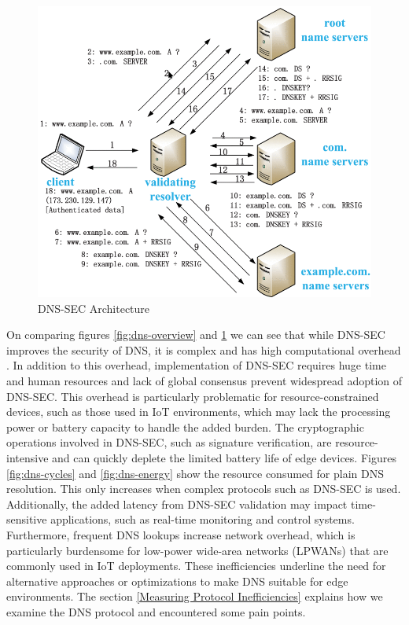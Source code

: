 \documentclass[conference]{IEEEtran}
\begin{document}
\begin{figure}[htbp]
    \centering
    \includegraphics[width=1\linewidth]{images/dnssec-overview.png}
    \caption{DNS-SEC Architecture \cite{8653281}}
    \label{fig:DNS-SEC-overview}
\end{figure}

On comparing figures \ref{fig:dns-overview} and \ref{fig:DNS-SEC-overview} we can see that while DNS-SEC improves the security of DNS, it is complex and has high computational overhead \cite{8653281}. In addition to this overhead, implementation of DNS-SEC requires huge time and human resources and lack of global consensus \cite{polo-2022} prevent widespread adoption of DNS-SEC. This overhead is particularly problematic for resource-constrained devices, such as those used in IoT environments, which may lack the processing power or battery capacity to handle the added burden. The cryptographic operations involved in DNS-SEC, such as signature verification, are resource-intensive and can quickly deplete the limited battery life of edge devices. Figures \ref{fig:dns-cycles} and \ref{fig:dns-energy} show the resource consumed for plain DNS resolution. This only increases when complex protocols such as DNS-SEC is used. Additionally, the added latency from DNS-SEC validation may impact time-sensitive applications, such as real-time monitoring and control systems. Furthermore, frequent DNS lookups increase network overhead, which is particularly burdensome for low-power wide-area networks (LPWANs) that are commonly used in IoT deployments. These inefficiencies underline the need for alternative approaches or optimizations to make DNS suitable for edge environments. The section \ref{Measuring Protocol Inefficiencies} explains how we examine the DNS protocol and encountered some pain points.
\end{document}
